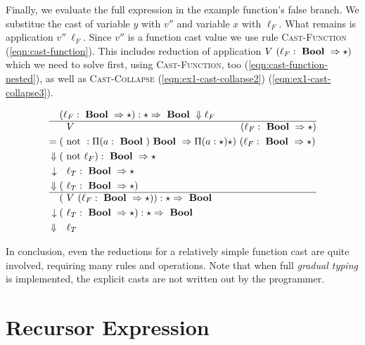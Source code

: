 Finally, we evaluate the full expression in the example function's false branch. We substitue the cast of variable $y$ with $v''$ and variable $x$ with $\ell_F$. What remains is application $v''~\ell_F$. Since $v''$ is a function cast value we use rule \textsc{Cast-Function} (\ref{eqn:cast-function}). This includes reduction of application $V~(\ell_F : \text{ \textbf{Bool} } \Rightarrow \star)$ which we need to solve first, using \textsc{Cast-Function}, too (\ref{eqn:cast-function-nested}), as well as \textsc{Cast-Collapse} (\ref{eqn:ex1-cast-collapse2}) (\ref{eqn:ex1-cast-collapse3}).

\begin{align}
(&\ell_F : \Bool \Rightarrow \star) : \star \Rightarrow \Bool \Downarrow \ell_F \label{eqn:ex1-cast-collapse2} \\ \hline
&~V~ \hspace{16.6em} (\ell_F : \Bool \Rightarrow \star) \\
= ( &\notf : \Pi(a:\Bool) \Bool \Rightarrow \Pi(a:\star) \star)~(\ell_F : \Bool \Rightarrow \star) \\
\Downarrow ( &\notf \ell_F ) : \Bool \Rightarrow \star \\
\downarrow ~~&~\ell_T : \Bool \Rightarrow \star \label{eqn:cast-function-nested} \\
\Downarrow (&~\ell_T : \Bool \Rightarrow \star) \\ \hline
( & ~V~(\ell_F : \Bool \Rightarrow \star)) : \star \Rightarrow \Bool \\
\downarrow (&~\ell_T : \Bool \Rightarrow \star) : \star \Rightarrow \Bool \label{eqn:cast-function} \\
\Downarrow ~~ & ~\ell_T \label{eqn:ex1-cast-collapse3}
\end{align}

In conclusion, even the reductions for a relatively simple function cast are quite involved, requiring many rules and operations. Note that when full \emph{gradual typing} is implemented, the explicit casts are not written out by the programmer.

\section{Recursor Expression}
